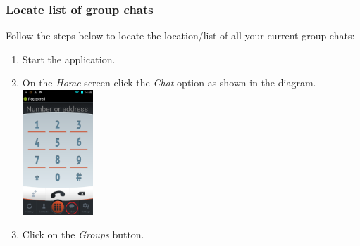 \documentclass[11pt]{article}
\begin{document}
\subsubsection{Locate list of group chats} \label{locate}
Follow the steps below to locate the location/list of all your current group chats:
\begin{enumerate}
\item Start the application.
\item On the \textit{Home} screen click the \textit{Chat} option as shown in the diagram.\\
\includegraphics[width=100px]{images/mainScreen.png}
\item Click on the \textit{Groups} button.\\


\end{enumerate}
\end{document}
